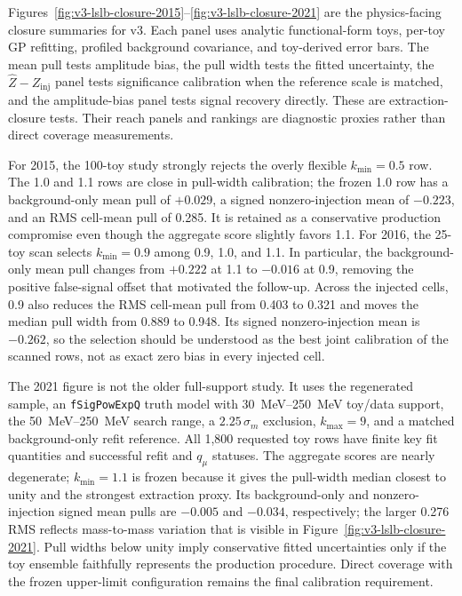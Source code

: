 Figures~\ref{fig:v3-lslb-closure-2015}--\ref{fig:v3-lslb-closure-2021} are the
physics-facing closure summaries for v3. Each panel uses analytic functional-form toys,
per-toy GP refitting, profiled background covariance, and toy-derived error bars. The
mean pull tests amplitude bias, the pull width tests the fitted uncertainty, the
$\hat Z-Z_{\mathrm{inj}}$ panel tests significance calibration when the reference scale
is matched, and the amplitude-bias panel tests signal recovery directly. These are
extraction-closure tests. Their reach panels and rankings are diagnostic proxies rather
than direct \CLs{} coverage measurements.

For 2015, the 100-toy study strongly rejects the overly flexible
$k_{\min}=0.5$ row. The 1.0 and 1.1 rows are close in pull-width calibration; the frozen
1.0 row has a background-only mean pull of $+0.029$, a signed nonzero-injection mean of
$-0.223$, and an RMS cell-mean pull of 0.285. It is retained as a conservative
production compromise even though the aggregate score slightly favors 1.1. For 2016,
the 25-toy scan selects $k_{\min}=0.9$ among 0.9, 1.0, and 1.1. In particular, the
background-only mean pull changes from $+0.222$ at 1.1 to $-0.016$ at 0.9, removing
the positive false-signal offset that motivated the follow-up. Across the injected
cells, 0.9 also reduces the RMS cell-mean pull from 0.403 to 0.321 and moves the median
pull width from 0.889 to 0.948. Its signed nonzero-injection mean is $-0.262$, so the
selection should be understood as the best joint calibration of the scanned rows, not
as exact zero bias in every injected cell.

The 2021 figure is not the older full-support study. It uses the regenerated
 sample, an \texttt{fSigPowExpQ} truth model with
\SIrange{30}{250}{MeV} toy/data support, the \SIrange{50}{250}{MeV} search range, a
$2.25\,\sigma_m$ exclusion, $k_{\max}=9$, and a matched background-only refit reference.
All 1,800 requested toy rows have finite key fit quantities and successful refit and
$q_\mu$ statuses. The aggregate scores are nearly degenerate; $k_{\min}=1.1$ is frozen
because it gives the pull-width median closest to unity and the strongest extraction
proxy. Its background-only and nonzero-injection signed mean pulls are $-0.005$ and
$-0.034$, respectively; the larger 0.276 RMS reflects mass-to-mass variation that is
visible in Figure~\ref{fig:v3-lslb-closure-2021}. Pull widths below unity imply
conservative fitted uncertainties only if the toy ensemble faithfully represents the
production procedure. Direct coverage with the frozen upper-limit configuration
remains the final calibration requirement.

